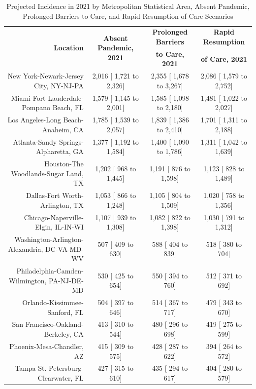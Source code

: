 \documentclass{article}
\begin{document}
\begin{table}[H]
	\caption{Projected Incidence in 2021 by Metropolitan Statistical Area, Absent Pandemic, Prolonged Barriers to Care, and Rapid Resumption of Care Scenarios}
	\footnotesize
	\begin{tabular}{|r|c|c|c|}
		\hline
		\multirow{2}{*}{\textbf{Location}} & \multirow{2}{*}{\textbf{Absent Pandemic, 2021}} & \textbf{Prolonged Barriers} & \textbf{Rapid Resumption}\\
		&  & \textbf{to Care, 2021} & \textbf{of Care, 2021}\\
		\hline\hline
		New York-Newark-Jersey City, NY-NJ-PA &  2,016 [ 1,721 to  2,326] &  2,355 [ 1,678 to  3,267] &  2,086 [ 1,579 to  2,752]\\
		Miami-Fort Lauderdale-Pompano Beach, FL &  1,579 [ 1,145 to  2,001] &  1,585 [ 1,098 to  2,180] &  1,481 [ 1,022 to  2,027]\\
		Los Angeles-Long Beach-Anaheim, CA &  1,785 [ 1,539 to  2,057] &  1,839 [ 1,386 to  2,410] &  1,701 [ 1,311 to  2,188]\\
		Atlanta-Sandy Springs-Alpharetta, GA &  1,377 [ 1,192 to  1,584] &  1,400 [ 1,090 to  1,786] &  1,311 [ 1,042 to  1,639]\\
		Houston-The Woodlands-Sugar Land, TX &  1,202 [   968 to  1,445] &  1,191 [   876 to  1,598] &  1,123 [   828 to  1,489]\\
		Dallas-Fort Worth-Arlington, TX &  1,053 [   866 to  1,248] &  1,105 [   804 to  1,509] &  1,020 [   758 to  1,356]\\
		Chicago-Naperville-Elgin, IL-IN-WI &  1,107 [   939 to  1,308] &  1,082 [   822 to  1,398] &  1,030 [   791 to  1,312]\\
		Washington-Arlington-Alexandria, DC-VA-MD-WV &    507 [   409 to    630] &    588 [   404 to    839] &    518 [   380 to    704]\\
		Philadelphia-Camden-Wilmington, PA-NJ-DE-MD &    530 [   425 to    654] &    550 [   394 to    760] &    512 [   371 to    692]\\
		Orlando-Kissimmee-Sanford, FL &    504 [   397 to    646] &    514 [   367 to    717] &    479 [   343 to    670]\\
		San Francisco-Oakland-Berkeley, CA &    413 [   310 to    544] &    480 [   296 to    698] &    419 [   275 to    599]\\
		Phoenix-Mesa-Chandler, AZ &    415 [   309 to    575] &    428 [   287 to    622] &    394 [   264 to    572]\\
		Tampa-St. Petersburg-Clearwater, FL &    427 [   315 to    610] &    435 [   294 to    617] &    404 [   280 to    579]\\

\end{tabular}
\end{table}
\end{document}
